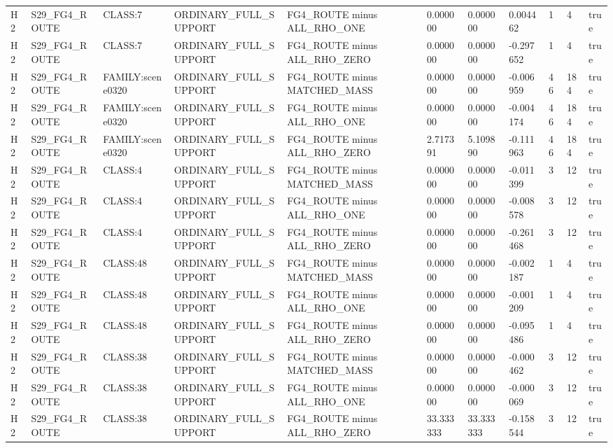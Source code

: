 \begin{tabular}{lllllllllll}
H2 & S29\_FG4\_ROUTE & CLASS:7 & ORDINARY\_FULL\_SUPPORT & FG4\_ROUTE minus ALL\_RHO\_ONE & 0.000000 & 0.000000 & 0.004462 & 1 & 4 & true \\
H2 & S29\_FG4\_ROUTE & CLASS:7 & ORDINARY\_FULL\_SUPPORT & FG4\_ROUTE minus ALL\_RHO\_ZERO & 0.000000 & 0.000000 & -0.297652 & 1 & 4 & true \\
H2 & S29\_FG4\_ROUTE & FAMILY:scene0320 & ORDINARY\_FULL\_SUPPORT & FG4\_ROUTE minus MATCHED\_MASS & 0.000000 & 0.000000 & -0.006959 & 46 & 184 & true \\
H2 & S29\_FG4\_ROUTE & FAMILY:scene0320 & ORDINARY\_FULL\_SUPPORT & FG4\_ROUTE minus ALL\_RHO\_ONE & 0.000000 & 0.000000 & -0.004174 & 46 & 184 & true \\
H2 & S29\_FG4\_ROUTE & FAMILY:scene0320 & ORDINARY\_FULL\_SUPPORT & FG4\_ROUTE minus ALL\_RHO\_ZERO & 2.717391 & 5.109890 & -0.111963 & 46 & 184 & true \\
H2 & S29\_FG4\_ROUTE & CLASS:4 & ORDINARY\_FULL\_SUPPORT & FG4\_ROUTE minus MATCHED\_MASS & 0.000000 & 0.000000 & -0.011399 & 3 & 12 & true \\
H2 & S29\_FG4\_ROUTE & CLASS:4 & ORDINARY\_FULL\_SUPPORT & FG4\_ROUTE minus ALL\_RHO\_ONE & 0.000000 & 0.000000 & -0.008578 & 3 & 12 & true \\
H2 & S29\_FG4\_ROUTE & CLASS:4 & ORDINARY\_FULL\_SUPPORT & FG4\_ROUTE minus ALL\_RHO\_ZERO & 0.000000 & 0.000000 & -0.261468 & 3 & 12 & true \\
H2 & S29\_FG4\_ROUTE & CLASS:48 & ORDINARY\_FULL\_SUPPORT & FG4\_ROUTE minus MATCHED\_MASS & 0.000000 & 0.000000 & -0.002187 & 1 & 4 & true \\
H2 & S29\_FG4\_ROUTE & CLASS:48 & ORDINARY\_FULL\_SUPPORT & FG4\_ROUTE minus ALL\_RHO\_ONE & 0.000000 & 0.000000 & -0.001209 & 1 & 4 & true \\
H2 & S29\_FG4\_ROUTE & CLASS:48 & ORDINARY\_FULL\_SUPPORT & FG4\_ROUTE minus ALL\_RHO\_ZERO & 0.000000 & 0.000000 & -0.095486 & 1 & 4 & true \\
H2 & S29\_FG4\_ROUTE & CLASS:38 & ORDINARY\_FULL\_SUPPORT & FG4\_ROUTE minus MATCHED\_MASS & 0.000000 & 0.000000 & -0.000462 & 3 & 12 & true \\
H2 & S29\_FG4\_ROUTE & CLASS:38 & ORDINARY\_FULL\_SUPPORT & FG4\_ROUTE minus ALL\_RHO\_ONE & 0.000000 & 0.000000 & -0.000069 & 3 & 12 & true \\
H2 & S29\_FG4\_ROUTE & CLASS:38 & ORDINARY\_FULL\_SUPPORT & FG4\_ROUTE minus ALL\_RHO\_ZERO & 33.333333 & 33.333333 & -0.158544 & 3 & 12 & true \\

\end{tabular}
